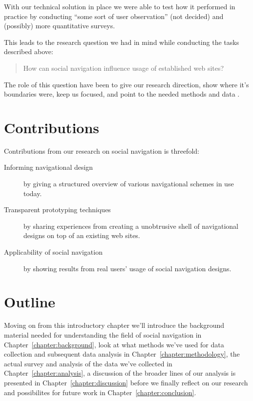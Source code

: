 With our technical solution in place we were able to test how it performed in
practice by conducting ``some sort of user observation'' (not decided) and
(possibly) more quantitative surveys.

This leads to the research question we had in mind while conducting
the tasks described above:

\begin{quote}
  How can social navigation influence usage of established web sites?
\end{quote}

The role of this question have been to give our research direction, show where
it's boundaries were, keep us focused, and point to the needed methods and
data \citep[p.~77]{silverman05}.


\section{Contributions}

Contributions from our research on social navigation is threefold:

\begin{description}
  \item[Informing navigational design] by giving a structured overview of
    various navigational schemes in use today.
  \item[Transparent prototyping techniques] by sharing experiences from
    creating a unobtrusive shell of navigational designs on top of an
    existing web sites.
  \item[Applicability of social navigation] by showing results from real
    users' usage of social navigation designs.
\end{description}

\section{Outline}

Moving on from this introductory chapter we'll introduce the background
material needed for understanding the field of social
navigation in Chapter~\ref{chapter:background}, look at what methods we've
used for data collection and subsequent data analysis in
Chapter~\ref{chapter:methodology}, the actual survey and analysis of the data
we've collected in Chapter~\ref{chapter:analysis}, a discussion of the
broader lines of our analysis is presented in Chapter~\ref{chapter:discussion}
before we finally reflect on our research and possibilites for future work
in Chapter~\ref{chapter:conclusion}.
